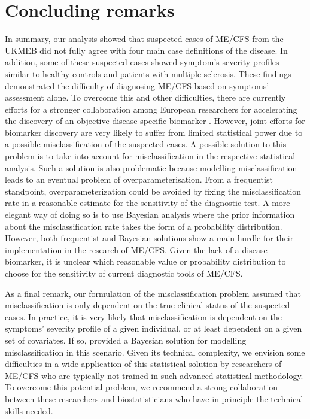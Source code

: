 \section{Concluding remarks}

In summary, our analysis showed that suspected cases of ME/CFS from the UKMEB did not fully agree with four main case definitions of the disease. In addition, some of these suspected cases showed symptom's severity profiles similar to healthy controls and patients with multiple sclerosis. These findings demonstrated the difficulty of diagnosing ME/CFS based on symptoms' assessment alone. To overcome this and other difficulties, there are currently efforts for a stronger collaboration among European researchers for accelerating the discovery of an objective disease-specific biomarker \citep{scheibenbogen2017EuropeanME}. However, joint efforts for biomarker discovery are very likely to suffer from limited statistical power due to a possible misclassification of the suspected cases. A possible solution to this problem is to take into account for misclassification in the respective statistical analysis. Such a solution is also problematic because modelling misclassification leads to an eventual problem of overparameterisation. From a frequentist standpoint, overparameterization could be avoided by fixing the misclassification rate in a reasonable estimate for the sensitivity of the diagnostic test. A more elegant way of doing so is to use Bayesian analysis where the prior information about the misclassification rate takes the form of a probability distribution. However, both frequentist and Bayesian solutions show a main hurdle for their implementation in the research of ME/CFS. Given the lack of a disease biomarker, it is unclear which reasonable value or probability distribution to choose for the sensitivity of current diagnostic tools of ME/CFS. 

As a final remark, our formulation of the misclassification problem assumed that misclassification is only dependent on the true clinical status of the suspected cases. In practice, it is very likely that misclassification is dependent on the symptoms' severity profile of a given individual, or at least dependent on a given set of covariates. If so, \citet{paulinoBinomialRegressionMisclassification2003} provided a Bayesian solution for modelling misclassification in this scenario. Given its technical complexity, we envision some difficulties in a wide application of this statistical solution by researchers of ME/CFS who are typically not trained in such advanced statistical methodology. To overcome this potential problem, we recommend a strong collaboration between these researchers and biostatisticians who have in principle the technical skills needed. %

